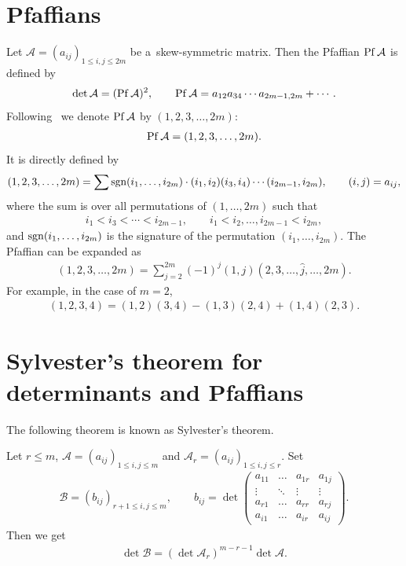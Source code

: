 \appendix

\section{Pfaf\/f\/ians} \label{appendixA}

Let ${\mathcal A} =(a_{ij})_{1\le i,j\le2m}$ be a~skew-symmetric matrix.
Then the Pfaf\/f\/ian ${\rm Pf}\, {\mathcal A}$ is def\/ined by
\begin{gather*}
\det{\mathcal A}=({\rm Pf}\,{\mathcal A})^2,\qquad {\rm Pf}\,{\mathcal A}=a_{12}a_{34}\cdots a_{2m-1,2m}+\cdots.
\end{gather*}
Following~\cite{H1} we denote ${\rm Pf}\, {\mathcal A}$ by $(1,2,3,\dots,2m)$:
\begin{gather*}
{\rm Pf}\,{\mathcal A}=(1,2,3,\dots,2m).
\end{gather*}
It is directly def\/ined by
\begin{gather*}
(1,2,3,\dots,2m)=\sum{\rm sgn}(i_1,\dots,i_{2m})\cdot(i_1,i_2)(i_3,i_4)\cdots(i_{2m-1},i_{2m}
),\qquad (i,j)=a_{ij},
\end{gather*}
where the sum is over all permutations of $(1,\dots,2m)$ such that
\begin{gather*}
i_1<i_3<\cdots<i_{2m-1},\qquad i_1<i_2,\dots,i_{2m-1}<i_{2m},
\end{gather*}
and ${\rm sgn}(i_1,\dots,i_{2m})$ is the signature of the permutation $(i_1,\dots,i_{2m})$.
The Pfaf\/f\/ian can be expanded as
\begin{gather*}
(1,2,3,\dots,2m)=\sum_{j=2}^{2m}(-1)^j(1,j)(2,3,\dots,\hat{j},\dots,2m).
\end{gather*}
For example, in the case of $m=2$,
\begin{gather*}
(1,2,3,4)=(1,2)(3,4)-(1,3)(2,4)+(1,4)(2,3).
\end{gather*}

\section{Sylvester's theorem for determinants and Pfaf\/f\/ians} \label{appendixB}

The following theorem is known as
Sylvester's theorem.
\begin{theorem}\label{theorem4}
Let $r\le m$, ${\mathcal A}=(a_{ij})_{1\le i,j\le m}$ and ${\mathcal A}_r=(a_{ij})_{1\le i,j\le r}$.
Set
\begin{gather*}
{\mathcal B}=(b_{ij})_{r+1\le i,j\le m},
\qquad
b_{ij}=\det\left(
\begin{matrix}a_{11}&\hdots&a_{1r}&a_{1j}
\\
\vdots&\ddots&\vdots&\vdots
\\
a_{r1}&\hdots&a_{rr}&a_{rj}
\\
a_{i1}&\hdots&a_{ir}&a_{ij}
\end{matrix}
\right).
\end{gather*}
Then we get
\begin{gather*}%
\det{\mathcal B}=(\det{\mathcal A}_r)^{m-r-1}\det{\mathcal A}.
\end{gather*}
\end{theorem}

